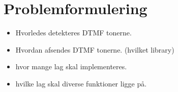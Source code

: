 \section{Problemformulering}

\begin{itemize}[noitemsep]
	\item Hvorledes detekteres DTMF tonerne.
	\item Hvordan afsendes DTMF tonerne. (hvilket library)
	\item hvor mange lag skal implementeres.
	\item hvilke lag skal diverse funktioner ligge på.
\end{itemize}